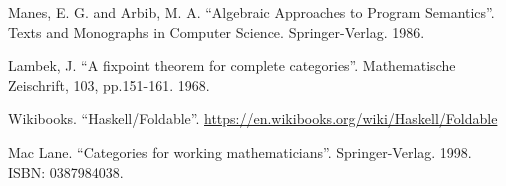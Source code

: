 \documentclass{article}
\begin{document}
\begin{thebibliography}{99}
Manes, E. G. and Arbib, M. A. ``Algebraic Approaches to Program Semantics''. Texts and Monographs in Computer Science. Springer-Verlag. 1986.

Lambek, J. ``A fixpoint theorem for complete categories''. Mathematische Zeischrift, 103, pp.151-161. 1968.

Wikibooks. ``Haskell/Foldable''.  \url{https://en.wikibooks.org/wiki/Haskell/Foldable}

Mac Lane. ``Categories for working mathematicians''. Springer-Verlag. 1998. ISBN: 0387984038.

\end{thebibliography}

\expandafter\enddocument

\fi
\end{document}
